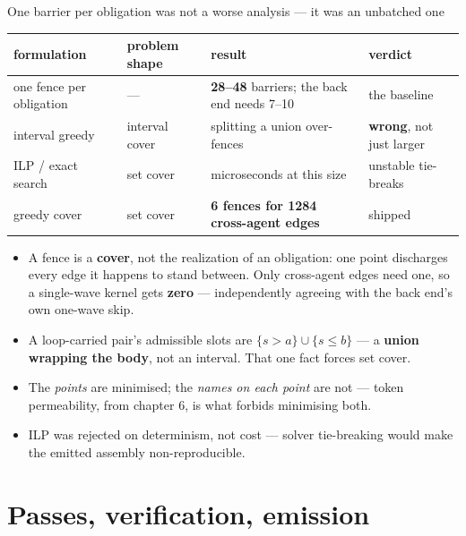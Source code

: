 \documentclass[aspectratio=169,9pt]{beamer}
\newcommand{\key}[1]{\textcolor{acc}{\textbf{#1}}}
\newcommand{\bad}[1]{\textcolor{warn}{\textbf{#1}}}
\newcommand{\good}[1]{\textcolor{ok}{\textbf{#1}}}
\begin{document}
\begin{frame}{One barrier per obligation was not a worse analysis --- it was an unbatched one}
\begin{center}
{\scriptsize
\begin{tabular}{llll}
\toprule
\textbf{formulation} & \textbf{problem shape} & \textbf{result} & \textbf{verdict} \\
\midrule
one fence per obligation & --- & \bad{28--48} barriers; the back end needs 7--10 & the baseline \\
interval greedy & interval cover & splitting a union over-fences & \bad{wrong}, not just larger \\
ILP / exact search & set cover & microseconds at this size & unstable tie-breaks \\
greedy cover & set cover & \good{6 fences for 1284 cross-agent edges} & shipped \\
\bottomrule
\end{tabular}}
\end{center}
\vspace{2mm}
\begin{itemize}
\item A fence is a \key{cover}, not the realization of an obligation: one point discharges every
      edge it happens to stand between. Only cross-agent edges need one, so a single-wave kernel
      gets \good{zero} --- independently agreeing with the back end's own one-wave skip.
\item A loop-carried pair's admissible slots are $\{s>a\}\cup\{s\le b\}$ --- a \key{union wrapping
      the body}, not an interval. That one fact forces set cover.
\item The \emph{points} are minimised; the \emph{names on each point} are not --- token
      permeability, from chapter 6, is what forbids minimising both.
\item ILP was rejected on determinism, not cost --- solver tie-breaking would make the emitted
      assembly non-reproducible.
\end{itemize}
\end{frame}

\section{Passes, verification, emission}
\end{document}
